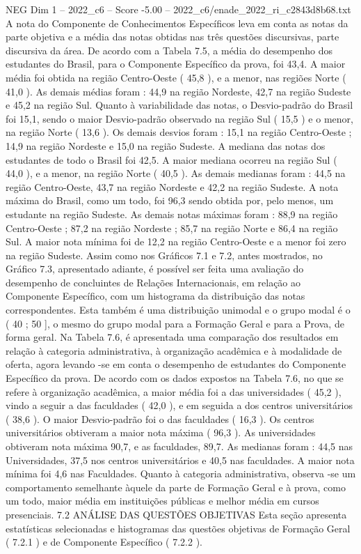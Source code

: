 \begin{textsample}{NEG Dim 1 – 2022\_c6 – Score -5.00 – 2022\_c6/enade\_2022\_ri\_c2843d8b68.txt}
A nota do Componente de Conhecimentos Específicos leva em conta as notas da parte objetiva e a média das notas obtidas nas três questões discursivas, parte discursiva da área.
De acordo com a Tabela 7.5, a média do desempenho dos estudantes do Brasil, para o Componente Específico da prova, foi 43,4.
A maior média foi obtida na região Centro-Oeste ( 45,8 ), e a menor, nas regiões Norte ( 41,0 ).
As demais médias foram : 44,9 na região Nordeste, 42,7 na região Sudeste e 45,2 na região Sul.
Quanto à variabilidade das notas, o Desvio-padrão do Brasil foi 15,1, sendo o maior Desvio-padrão observado na região Sul ( 15,5 ) e o menor, na região Norte ( 13,6 ).
Os demais desvios foram : 15,1 na região Centro-Oeste ; 14,9 na região Nordeste e 15,0 na região Sudeste.
A mediana das notas dos estudantes de todo o Brasil foi 42,5.
A maior mediana ocorreu na região Sul ( 44,0 ), e a menor, na região Norte ( 40,5 ).
As demais medianas foram : 44,5 na região Centro-Oeste, 43,7 na região Nordeste e 42,2 na região Sudeste.
A nota máxima do Brasil, como um todo, foi 96,3 sendo obtida por, pelo menos, um estudante na região Sudeste.
As demais notas máximas foram : 88,9 na região Centro-Oeste ; 87,2 na região Nordeste ; 85,7 na região Norte e 86,4 na região Sul.
A maior nota mínima foi de 12,2 na região Centro-Oeste e a menor foi zero na região Sudeste.
Assim como nos Gráficos 7.1 e 7.2, antes mostrados, no Gráfico 7.3, apresentado adiante, é possível ser feita uma avaliação do desempenho de concluintes de Relações Internacionais, em relação ao Componente Específico, com um histograma da distribuição das notas correspondentes.
Esta também é uma distribuição unimodal e o grupo modal é o ( 40 ; 50 ], o mesmo do grupo modal para a Formação Geral e para a Prova, de forma geral.
Na Tabela 7.6, é apresentada uma comparação dos resultados em relação à categoria administrativa, à organização acadêmica e à modalidade de oferta, agora levando -se em conta o desempenho de estudantes do Componente Específico da prova.
De acordo com os dados expostos na Tabela 7.6, no que se refere à organização acadêmica, a maior média foi a das universidades ( 45,2 ), vindo a seguir a das faculdades ( 42,0 ), e em seguida a dos centros universitários ( 38,6 ).
O maior Desvio-padrão foi o das faculdades ( 16,3 ).
Os centros universitários obtiveram a maior nota máxima ( 96,3 ).
As universidades obtiveram nota máxima 90,7, e as faculdades, 89,7.
As medianas foram : 44,5 nas Universidades, 37,5 nos centros universitários e 40,5 nas faculdades.
A maior nota mínima foi 4,6 nas Faculdades.
Quanto à categoria administrativa, observa -se um comportamento semelhante àquele da parte de Formação Geral e à prova, como um todo, maior média em instituições públicas e melhor média em cursos presenciais. 7.2 ANÁLISE DAS QUESTÕES OBJETIVAS Esta seção apresenta estatísticas selecionadas e histogramas das questões objetivas de Formação Geral ( 7.2.1 ) e de Componente Específico ( 7.2.2 ).

\end{textsample}
